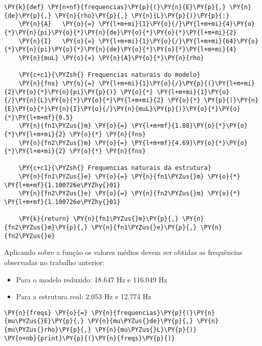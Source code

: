     \begin{tcolorbox}[breakable, size=fbox, boxrule=1pt, pad at break*=1mm,colback=cellbackground, colframe=cellborder]
\begin{Verbatim}[commandchars=\\\{\}]
\PY{k}{def} \PY{n+nf}{frequencias}\PY{p}{(}\PY{n}{E}\PY{p}{,} \PY{n}{de}\PY{p}{,} \PY{n}{rho}\PY{p}{,} \PY{n}{L}\PY{p}{)}\PY{p}{:}
    \PY{n}{A}   \PY{o}{=} \PY{l+m+mi}{1}\PY{o}{/}\PY{l+m+mi}{4}\PY{o}{*}\PY{n}{pi}\PY{o}{*}\PY{n}{de}\PY{o}{*}\PY{o}{*}\PY{l+m+mi}{2} 
    \PY{n}{I}   \PY{o}{=} \PY{l+m+mi}{1}\PY{o}{/}\PY{l+m+mi}{64}\PY{o}{*}\PY{n}{pi}\PY{o}{*}\PY{n}{de}\PY{o}{*}\PY{o}{*}\PY{l+m+mi}{4}
    \PY{n}{muL} \PY{o}{=} \PY{n}{A}\PY{o}{*}\PY{n}{rho}
    
    \PY{c+c1}{\PYZsh{} Frequencias naturais do modelo}
    \PY{n}{fns} \PY{o}{=} \PY{l+m+mi}{1}\PY{o}{/}\PY{p}{(}\PY{l+m+mi}{2}\PY{o}{*}\PY{n}{pi}\PY{p}{)} \PY{o}{*} \PY{l+m+mi}{1}\PY{o}{/}\PY{n}{L}\PY{o}{*}\PY{o}{*}\PY{l+m+mi}{2} \PY{o}{*} \PY{p}{(}\PY{n}{E}\PY{o}{*}\PY{n}{I}\PY{o}{/}\PY{n}{muL}\PY{p}{)}\PY{o}{*}\PY{o}{*}\PY{l+m+mf}{0.5}
    \PY{n}{fn1\PYZus{}m} \PY{o}{=} \PY{l+m+mf}{1.88}\PY{o}{*}\PY{o}{*}\PY{l+m+mi}{2} \PY{o}{*} \PY{n}{fns}
    \PY{n}{fn2\PYZus{}m} \PY{o}{=} \PY{l+m+mf}{4.69}\PY{o}{*}\PY{o}{*}\PY{l+m+mi}{2} \PY{o}{*} \PY{n}{fns}
    
    \PY{c+c1}{\PYZsh{} Frequencias naturais da estrutura}
    \PY{n}{fn1\PYZus{}e} \PY{o}{=} \PY{n}{fn1\PYZus{}m} \PY{o}{*} \PY{l+m+mf}{1.100726e\PYZhy{}01}
    \PY{n}{fn2\PYZus{}e} \PY{o}{=} \PY{n}{fn2\PYZus{}m} \PY{o}{*} \PY{l+m+mf}{1.100726e\PYZhy{}01}
    
    \PY{k}{return} \PY{n}{fn1\PYZus{}m}\PY{p}{,} \PY{n}{fn2\PYZus{}m}\PY{p}{,} \PY{n}{fn1\PYZus{}e}\PY{p}{,} \PY{n}{fn2\PYZus{}e}
\end{Verbatim}
\end{tcolorbox}

    Aplicando sobre a função os valores médios devem ser obtidas as
frequências observadas no trabalho anterior:

\begin{itemize}
\item
  Para o modelo reduzido: 18.647 Hz e 116.049 Hz
\item
  Para a estrutura real: 2.053 Hz e 12.774 Hz
\end{itemize}

    \begin{tcolorbox}[breakable, size=fbox, boxrule=1pt, pad at break*=1mm,colback=cellbackground, colframe=cellborder]
\begin{Verbatim}[commandchars=\\\{\}]
\PY{n}{freqs} \PY{o}{=} \PY{n}{frequencias}\PY{p}{(}\PY{n}{mu\PYZus{}E}\PY{p}{,} \PY{n}{mu\PYZus{}de}\PY{p}{,} \PY{n}{mu\PYZus{}rho}\PY{p}{,} \PY{n}{mu\PYZus{}L}\PY{p}{)}
\PY{n+nb}{print}\PY{p}{(}\PY{n}{freqs}\PY{p}{)}
\end{Verbatim}
\end{tcolorbox}

